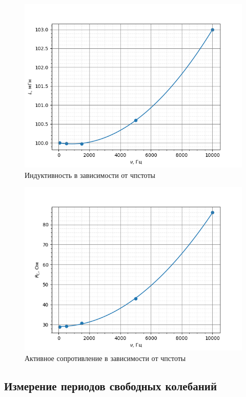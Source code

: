 \documentclass[a4paper,12 pt]{article}
\begin{document}
\begin{figure}[H]
    \centering
    \includegraphics[scale=0.8]{индуктивность.png}
    \caption{Индуктивность в зависимости от чпстоты}
\end{figure}



\begin{figure}[H]
    \centering
    \includegraphics[scale=0.8]{активсопр.png}
    \caption{Активное сопротивление в зависимости от чпстоты}
\end{figure}

\subsection{Измерение периодов свободных колебаний}
\end{document}
